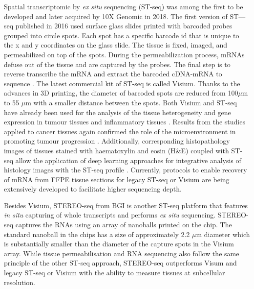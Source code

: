 Spatial transcriptomic by \textit{ex situ} sequencing (ST-seq) was among the first to be developed and later acquired by 10X Genomic in 2018. The first version of ST—seq published in 2016 used surface glass slides printed with barcoded probes grouped into circle spots. Each spot has a specific barcode id that is unique to the x and y coordinates on the glass slide. The tissue is fixed, imaged, and permeabilized on top of the spots. During the permeabilization process, mRNAs defuse out of the tissue and are captured by the probes. The final step is to reverse transcribe the mRNA and extract the barcoded cDNA-mRNA to sequence \cite{staahl2016visualization, berglund2018spatial}. The latest commercial kit of ST-seq is called Visium. Thanks to the advances in 3D printing, the diameter of barcoded spots are reduced from  100$\mu$m to 55 $\mu$m with a smaller distance between the spots.  Both  Visium  and ST-seq have already been used for the analysis of the tissue heterogeneity and gene expression in tumour tissues \cite{berglund2018spatial, thrane2018spatially, moncada2019integrating,ji2020multimodal, yoosuf2020identification} and inflammatory tissues \cite{carlberg2019exploring}. Results from the studies applied to cancer tissues again confirmed the role of the microenvironment in promoting tumour progression \cite{thrane2018spatially, moncada2019integrating}. Additionally, corresponding histopathology images of tissues stained with haematoxylin and eosin (H\&E) coupled with ST-seq allow the application of deep learning approaches for integrative analysis of histology images with the ST-seq profile \cite{he2020integrating, tan2019spacell}. Currently, protocols to enable recovery of mRNA from FFPE tissue sections for legacy ST-seq or Visium are being extensively developed to facilitate higher sequencing depth.           

Besides Visium, STEREO-seq from BGI is another ST-seq platform that features \textit{in situ} capturing of whole transcripts and performs \textit{ex situ} sequencing. STEREO-seq captures the RNAs using an array of nanoballs printed on the chip. The standard nanoball in the chips has a size of approximately 2.2 $\mu$m diameter which is substantially smaller than the diameter of the capture spots in the Visium array. While tissue permeabilisation and RNA sequencing also follow the same principle of the other ST-seq approach, STEREO-seq outperforms Visum and legacy ST-seq or Visium with the ability to measure tissues at subcellular resolution.    

